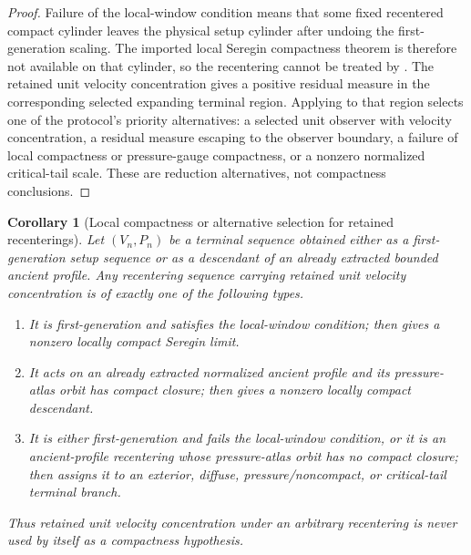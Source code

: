 \documentclass[11pt]{amsart}
\numberwithin{equation}{section}
\theoremstyle{plain}
\newtheorem{corollary}[corollary]{Corollary}
\theoremstyle{definition}
\theoremstyle{remark}
\begin{document}
\begin{proof}
Failure of the local-window condition means that some fixed recentered compact
cylinder leaves the physical setup cylinder after undoing the first-generation
scaling.  The imported local Seregin compactness theorem is therefore not
available on that cylinder, so the recentering cannot be treated by
.  The retained unit
velocity concentration gives a positive residual measure in the corresponding selected
expanding terminal region.  Applying
 to that region selects one
of the protocol's priority alternatives: a selected unit observer with velocity
concentration, a residual measure escaping to the observer boundary, a failure
of local compactness or pressure-gauge compactness, or a nonzero normalized
critical-tail scale.  These are reduction alternatives, not compactness
conclusions.
\end{proof}

\begin{corollary}[Local compactness or alternative selection for retained recenterings]
\label{lem:retained-recentering-alternatives}
Let \((V_n,P_n)\) be a terminal sequence obtained either as a first-generation
setup sequence or as a descendant of an already extracted bounded
ancient profile.  Any recentering sequence carrying retained unit velocity concentration is
of exactly one of the following types.
\begin{enumerate}[label=\textup{(\roman*)}]
   \item It is first-generation and satisfies the local-window condition; then
    gives a nonzero locally
   compact Seregin limit.
   \item It acts on an already extracted normalized ancient profile and its
   pressure-atlas orbit has compact closure; then
    gives a nonzero locally
   compact descendant.
   \item It is either first-generation and fails the local-window condition, or
   it is an ancient-profile recentering whose pressure-atlas orbit has no
   compact closure; then
   assigns it to an exterior, diffuse, pressure/noncompact, or critical-tail
   terminal branch.
\end{enumerate}
Thus retained unit velocity concentration under an arbitrary recentering is never used by itself as a
compactness hypothesis.
\end{corollary}
\end{document}
